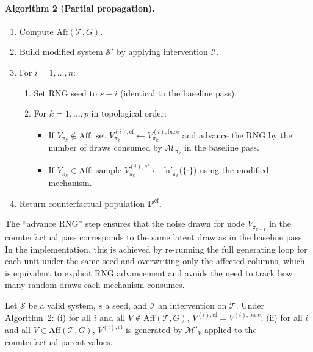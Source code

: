 \documentclass[article]{jss}
\begin{document}
\paragraph{Algorithm 2 (Partial propagation).}
\begin{enumerate}
  \item Compute $\mathrm{Aff}(\mathcal{T}, G)$.
  \item Build modified system $\mathcal{S}'$ by applying intervention $\mathcal{I}$.
  \item For $i = 1,\ldots,n$:
        \begin{enumerate}
          \item Set RNG seed to $s + i$ (identical to the baseline pass).
          \item For $k = 1,\ldots,p$ in topological order:
                \begin{itemize}[nosep]
                  \item If $V_{\pi_k}\notin\mathrm{Aff}$: set
                        $V_{\pi_k}^{(i),\mathrm{cf}} \leftarrow
                        V_{\pi_k}^{(i),\mathrm{base}}$ and advance the
                        RNG by the number of draws consumed by
                        $\mathcal{M}_{\pi_k}$ in the baseline pass.
                  \item If $V_{\pi_k}\in\mathrm{Aff}$: sample
                        $V_{\pi_k}^{(i),\mathrm{cf}} \leftarrow
                        \mathrm{fn}'_{\pi_k}\!\bigl(\{\cdot\}\bigr)$
                        using the modified mechanism.
                \end{itemize}
        \end{enumerate}
  \item Return counterfactual population $\mathbf{P}^{\mathrm{cf}}$.
\end{enumerate}

\begin{remark}
The ``advance RNG'' step ensures that the noise drawn for node $V_{\pi_{k+1}}$ in
the counterfactual pass corresponds to the same latent draw as in the baseline
pass. In the  implementation, this is achieved by re-running the full
generating loop for each unit under the same seed and overwriting only the
affected columns, which is equivalent to explicit RNG advancement and avoids the
need to track how many random draws each mechanism consumes.
\end{remark}

\begin{proposition}
\label{prop:cf}
Let $\mathcal{S}$ be a valid system, $s$ a seed, and $\mathcal{I}$ an intervention
on $\mathcal{T}$. Under Algorithm~2: (i) for all $i$ and all
$V\notin\mathrm{Aff}(\mathcal{T},G)$,
$V^{(i),\mathrm{cf}} = V^{(i),\mathrm{base}}$; (ii) for all $i$ and all
$V\in\mathrm{Aff}(\mathcal{T},G)$, $V^{(i),\mathrm{cf}}$ is generated by
$\mathcal{M}'_V$ applied to the counterfactual parent values.
\end{proposition}
\end{document}
